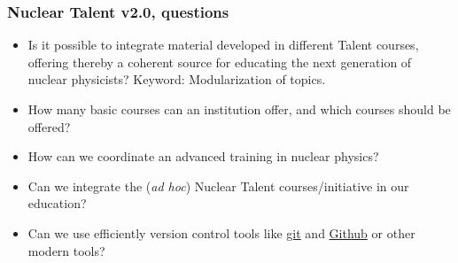 \documentclass{beamer}
\begin{document}
\begin{frame}
\frametitle{Nuclear Talent v2.0, questions}

\begin{block}{}
\begin{itemize}
\item Is it possible to integrate material developed in different Talent courses, offering thereby a coherent source for educating the next generation of nuclear physicists? Keyword: Modularization of topics.

\item How many basic courses can an institution offer, and which courses should be offered?

\item How can we  coordinate an advanced training in nuclear physics?

\item Can we integrate the (\emph{ad hoc}) Nuclear Talent courses/initiative  in our education?

\item Can we use efficiently version control tools  like \href{{https://git-scm.com/}}{git} and \href{{https://github.com/}}{Github} or other modern tools? 
\end{itemize}

\noindent
\end{block}
\end{frame}
\end{document}
